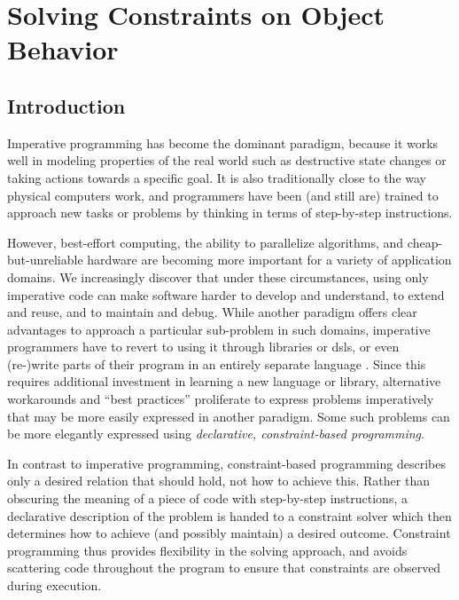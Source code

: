 \def\partautorefname{Part}
\def\chapterautorefname{Chapter}
\def\sectionautorefname{Section}
\def\subsectionautorefname{Section}
\def\subsubsectionautorefname{Section}
\def\tableautorefname{Table}
\def\figureautorefname{Figure}
\def\appendixautorefname{Appendix}

\part{Solving Constraints on Object Behavior}

\chapter{Introduction}
\label{cha:introduction}
 
Imperative programming has become the dominant paradigm, because it works well
in modeling properties of the real world such as destructive state changes or
taking actions towards a specific goal. It is also traditionally close to the
way physical computers work, and programmers have been (and still are) trained
to approach new tasks or problems by thinking in terms of step-by-step
instructions.

However, best-effort computing, the ability to parallelize algorithms, and
cheap-but-unreliable hardware are becoming more important for a variety of
application domains. We increasingly discover that under these circumstances,
using only imperative code can make software harder to develop and understand,
to extend and reuse, and to maintain and debug. While another paradigm offers
clear advantages to approach a particular sub-problem in such domains,
imperative programmers have to revert to using it through libraries or
\acp{dsl}, or even (re-)write parts of their program in an entirely separate
language . Since this requires additional investment in learning a new language
or library, alternative workarounds and ``best practices'' proliferate to
express problems imperatively that may be more easily expressed in another
paradigm. Some such problems can be more elegantly expressed using
\emph{declarative, constraint-based programming}.

In contrast to imperative programming, constraint-based programming describes
only a desired relation that should hold, not how to achieve this. Rather
than obscuring the meaning of a piece of code with step-by-step instructions, a
declarative description of the problem is handed to a constraint solver which
then determines how to achieve (and possibly maintain) a desired
outcome. Constraint programming thus provides flexibility in the solving
approach, and avoids scattering code throughout the program to ensure that
constraints are observed during execution.

